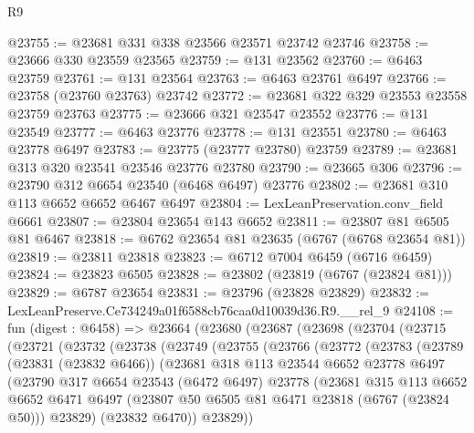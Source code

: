 \begin{lexlean}{R9}
\begin{coremodule}
@23755 := @23681 @331 @338 @23566 @23571 @23742 @23746
@23758 := @23666 @330 @23559 @23565
@23759 := @131 @23562
@23760 := @6463 @23759
@23761 := @131 @23564
@23763 := @6463 @23761 @6497
@23766 := @23758 (@23760 @23763) @23742
@23772 := @23681 @322 @329 @23553 @23558 @23759 @23763
@23775 := @23666 @321 @23547 @23552
@23776 := @131 @23549
@23777 := @6463 @23776
@23778 := @131 @23551
@23780 := @6463 @23778 @6497
@23783 := @23775 (@23777 @23780) @23759
@23789 := @23681 @313 @320 @23541 @23546 @23776 @23780
@23790 := @23665 @306
@23796 := @23790 @312 @6654 @23540 (@6468 @6497) @23776
@23802 := @23681 @310 @113 @6652 @6652 @6467 @6497
@23804 := LexLeanPreservation.conv_field @6661
@23807 := @23804 @23654 @143 @6652
@23811 := @23807 @81 @6505 @81 @6467
@23818 := @6762 @23654 @81 @23635 (@6767 (@6768 @23654 @81))
@23819 := @23811 @23818
@23823 := @6712 @7004 @6459 (@6716 @6459)
@23824 := @23823 @6505
@23828 := @23802 (@23819 (@6767 (@23824 @81)))
@23829 := @6787 @23654
@23831 := @23796 (@23828 @23829)
@23832 := LexLeanPreserve.Ce734249a01f6588cb76caa0d10039d36.R9.__rel_9
@24108 := fun (digest : @6458) =>
  @23664
    (@23680
      (@23687
        (@23698
          (@23704
            (@23715
              (@23721
                (@23732
                  (@23738
                    (@23749
                      (@23755
                        (@23766
                          (@23772
                            (@23783
                              (@23789
                                (@23831 (@23832 @6466))
                                (@23681
                                  @318
                                  @113
                                  @23544
                                  @6652
                                  @23778
                                  @6497
                                  (@23790
                                    @317
                                    @6654
                                    @23543
                                    (@6472 @6497)
                                    @23778
                                    (@23681
                                      @315
                                      @113
                                      @6652
                                      @6652
                                      @6471
                                      @6497
                                      (@23807 @50 @6505 @81 @6471 @23818 (@6767 (@23824 @50)))
                                      @23829)
                                    (@23832 @6470))
                                  @23829))

\end{coremodule}
\end{lexlean}
